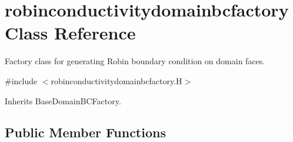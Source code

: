 \hypertarget{classrobinconductivitydomainbcfactory}{}\section{robinconductivitydomainbcfactory Class Reference}
\label{classrobinconductivitydomainbcfactory}


Factory class for generating Robin boundary condition on domain faces.  




{\ttfamily \#include $<$robinconductivitydomainbcfactory.\+H$>$}



Inherits Base\+Domain\+B\+C\+Factory.

\subsection*{Public Member Functions}
